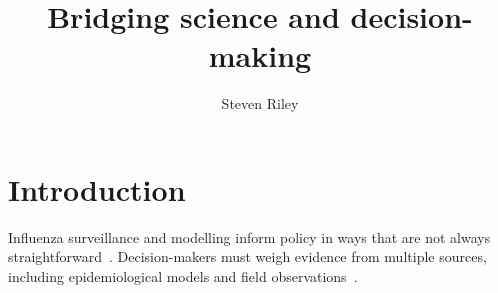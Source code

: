 \documentclass[11pt]{article}
\title{Bridging science and decision-making}
\author{Steven Riley}
\date{}
\begin{document}
\maketitle

\section{Introduction}

Influenza surveillance and modelling inform policy in ways that are not
always straightforward~\cite{riley2015}. Decision-makers must weigh
evidence from multiple sources, including epidemiological models and
field observations~\cite{ferguson2020}.

\nocite{lipsitch2009,vankerkhove2010,whitty2015,mccabe2021,hadley2021,medley2022}



\end{document}
